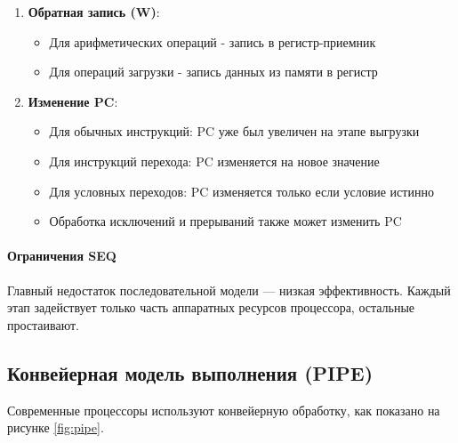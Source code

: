 \documentclass[12pt,a4paper]{article}
\begin{document}
\begin{enumerate}
    \item  \textbf{Обратная запись (W)}:
    \begin{itemize}
        \item Для арифметических операций - запись в регистр-приемник
        \item Для операций загрузки - запись данных из памяти в регистр
    \end{itemize}

    \item \textbf{Изменение PC}:
    \begin{itemize}
        \item Для обычных инструкций: PC уже был увеличен на этапе выгрузки
        \item Для инструкций перехода: PC изменяется на новое значение
        \item Для условных переходов: PC изменяется только если условие истинно
        \item Обработка исключений и прерываний также может изменить PC
    \end{itemize}
\end{enumerate}

\paragraph{Ограничения SEQ}
Главный недостаток последовательной модели — низкая эффективность. Каждый этап задействует только часть аппаратных ресурсов процессора, остальные простаивают.

\subsection{Конвейерная модель выполнения (PIPE)}
Современные процессоры используют конвейерную обработку, как показано на рисунке \ref{fig:pipe}.
\end{document}
